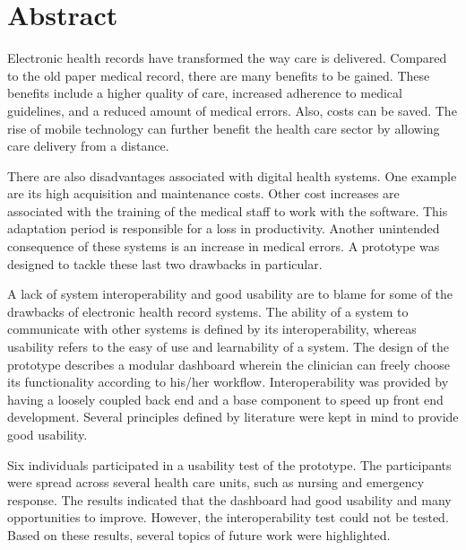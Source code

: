 \section*{Abstract}

Electronic health records have transformed the way care is delivered. Compared to the old paper medical record, there are many benefits to be gained. These benefits include a higher quality of care, increased adherence to medical guidelines, and a reduced amount of medical errors. Also, costs can be saved. The rise of mobile technology can further benefit the health care sector by allowing care delivery from a distance.

There are also disadvantages associated with digital health systems. One example are its high acquisition and maintenance costs. Other cost increases are associated with the training of the medical staff to work with the software. This adaptation period is responsible for a loss in productivity. Another unintended consequence of these systems is an increase in medical errors. A prototype was designed to tackle these last two drawbacks in particular.

A lack of system interoperability and good usability are to blame for some of the drawbacks of electronic health record systems. The ability of a system to communicate with other systems is defined by its interoperability, whereas usability refers to the easy of use and learnability of a system. The design of the prototype describes a modular dashboard wherein the clinician can freely choose its functionality according to his/her workflow. Interoperability was provided by having a loosely coupled back end and a base component to speed up front end development. Several principles defined by literature were kept in mind to provide good usability.

Six individuals participated in a usability test of the prototype. The participants were spread across several health care units, such as nursing and emergency response. The results indicated that the dashboard had good usability and many opportunities to improve. However, the interoperability test could not be tested. Based on these results, several topics of future work were highlighted.